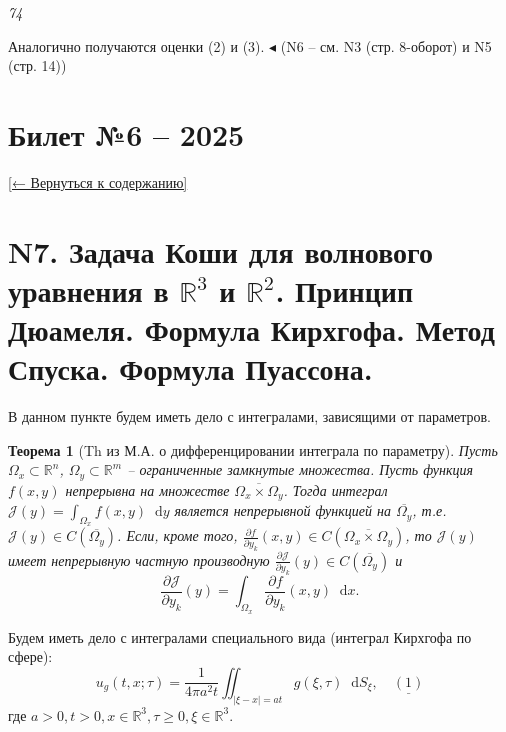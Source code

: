 \documentclass[12pt, a4paper]{article}
\newcommand{\backtotoc}{\small\hyperref[toc]{[← Вернуться к содержанию]}}
\newcommand{\R}{\mathbb{R}}
\newcommand{\dd}{\mathop{}\!\mathrm{d}} %
\newtheorem{theorem}{Теорема}[section] %
\begin{document}
\hfill \textit{74}

\setcounter{section}{1} %
\addtocounter{theorem}{4} %

Аналогично получаются оценки (2) и (3). $\blacktriangleleft$
(N6 -- см. N3 (стр. 8-оборот) и N5 (стр. 14))
\newpage
\section*{Билет №6 -- 2025}\label{sec:ticket6}
\backtotoc
\section*{N7. Задача Коши для волнового уравнения в $\R^3$ и $\R^2$. Принцип Дюамеля. Формула Кирхгофа. Метод Спуска. Формула Пуассона.}

В данном пункте будем иметь дело с интегралами, зависящими от параметров.
\begin{theorem}[Th из М.А. о дифференцировании интеграла по параметру]
\label{thm:diff_integral_param}
Пусть $\Omega_x \subset \R^n$, $\Omega_y \subset \R^m$ -- ограниченные замкнутые множества. Пусть функция $f(x,y)$ непрерывна на множестве $\overline{\Omega_x \times \Omega_y}$. Тогда интеграл $\mathcal{J}(y) = \int_{\Omega_x} f(x,y) \dd y$ является непрерывной функцией на $\overline{\Omega_y}$, т.е. $\mathcal{J}(y) \in C(\overline{\Omega_y})$.
Если, кроме того, $\frac{\partial f}{\partial y_k}(x,y) \in C(\overline{\Omega_x \times \Omega_y})$, то $\mathcal{J}(y)$ имеет непрерывную частную производную $\frac{\partial \mathcal{J}}{\partial y_k}(y) \in C(\overline{\Omega_y})$ и
$$ \frac{\partial \mathcal{J}}{\partial y_k}(y) = \int_{\Omega_x} \frac{\partial f}{\partial y_k}(x,y) \dd x. $$
\end{theorem}

Будем иметь дело с интегралами специального вида (интеграл Кирхгофа по сфере):
\begin{equation} \label{eq:kirchhoff_integral}
u_g(t,x;\tau) = \frac{1}{4\pi a^2 t} \iint_{|\xi-x|=at} g(\xi, \tau) \dd S_\xi, \quad \underline{(1)}
\end{equation}
где $a>0, t>0, x \in \R^3, \tau \ge 0, \xi \in \R^3$.
\end{document}
